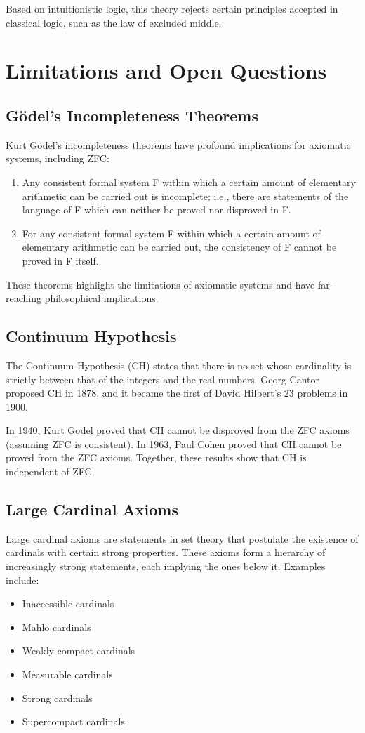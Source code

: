 \documentclass[12pt,a4paper]{article}
\newcommand{\sectiontitle}[1]{\section{\textcolor{draculaPurple}{#1}}}
\newcommand{\subsectiontitle}[1]{\subsection{\textcolor{draculaPink}{#1}}}
\begin{document}
Based on intuitionistic logic, this theory rejects certain principles accepted in classical logic, such as the law of excluded middle.

\sectiontitle{Limitations and Open Questions}

\subsectiontitle{Gödel's Incompleteness Theorems}

Kurt Gödel's incompleteness theorems have profound implications for axiomatic systems, including ZFC:

\begin{enumerate}
    \item Any consistent formal system F within which a certain amount of elementary arithmetic can be carried out is incomplete; i.e., there are statements of the language of F which can neither be proved nor disproved in F.
    \item For any consistent formal system F within which a certain amount of elementary arithmetic can be carried out, the consistency of F cannot be proved in F itself.
\end{enumerate}

These theorems highlight the limitations of axiomatic systems and have far-reaching philosophical implications.

\subsectiontitle{Continuum Hypothesis}

The Continuum Hypothesis (CH) states that there is no set whose cardinality is strictly between that of the integers and the real numbers. Georg Cantor proposed CH in 1878, and it became the first of David Hilbert's 23 problems in 1900.

In 1940, Kurt Gödel proved that CH cannot be disproved from the ZFC axioms (assuming ZFC is consistent). In 1963, Paul Cohen proved that CH cannot be proved from the ZFC axioms. Together, these results show that CH is independent of ZFC.

\subsectiontitle{Large Cardinal Axioms}

Large cardinal axioms are statements in set theory that postulate the existence of cardinals with certain strong properties. These axioms form a hierarchy of increasingly strong statements, each implying the ones below it. Examples include:

\begin{itemize}
    \item Inaccessible cardinals
    \item Mahlo cardinals
    \item Weakly compact cardinals
    \item Measurable cardinals
    \item Strong cardinals
    \item Supercompact cardinals
\end{itemize}
\end{document}
